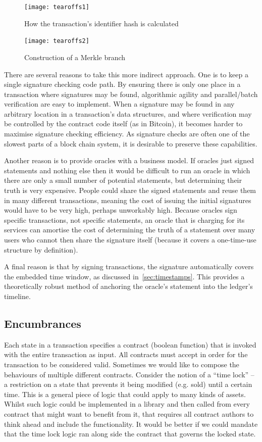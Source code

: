 \documentclass{article}
\begin{document}
\begin{figure}[H]
\texttt{[image: tearoffs1]}
\caption{How the transaction's identifier hash is calculated}
\end{figure}

\begin{figure}[H]
\texttt{[image: tearoffs2]}
\caption{Construction of a Merkle branch}
\end{figure}

There are several reasons to take this more indirect approach. One is to keep a single signature checking code
path. By ensuring there is only one place in a transaction where signatures may be found, algorithmic agility and
parallel/batch verification are easy to implement. When a signature may be found in any arbitrary location in a
transaction's data structures, and where verification may be controlled by the contract code itself (as in
Bitcoin), it becomes harder to maximise signature checking efficiency. As signature checks are often one of the
slowest parts of a block chain system, it is desirable to preserve these capabilities.

Another reason is to provide oracles with a business model. If oracles just signed statements and nothing else then
it would be difficult to run an oracle in which there are only a small number of potential statements, but
determining their truth is very expensive. People could share the signed statements and reuse them in many
different transactions, meaning the cost of issuing the initial signatures would have to be very high, perhaps
unworkably high. Because oracles sign specific transactions, not specific statements, an oracle that is charging
for its services can amortise the cost of determining the truth of a statement over many users who cannot then
share the signature itself (because it covers a one-time-use structure by definition).

A final reason is that by signing transactions, the signature automatically covers the embedded time window, as
discussed in~\cref{sec:timestamps}. This provides a theoretically robust method of anchoring the oracle's statement
into the ledger's timeline.

\subsection{Encumbrances}\label{sec:encumbrances}

Each state in a transaction specifies a contract (boolean function) that is invoked with the entire transaction as
input. All contracts must accept in order for the transaction to be considered valid. Sometimes we would like to
compose the behaviours of multiple different contracts. Consider the notion of a ``time lock'' -- a restriction on
a state that prevents it being modified (e.g. sold) until a certain time. This is a general piece of logic that
could apply to many kinds of assets. Whilst such logic could be implemented in a library and then called from every
contract that might want to benefit from it, that requires all contract authors to think ahead and include the
functionality. It would be better if we could mandate that the time lock logic ran along side the contract that
governs the locked state.
\end{document}
